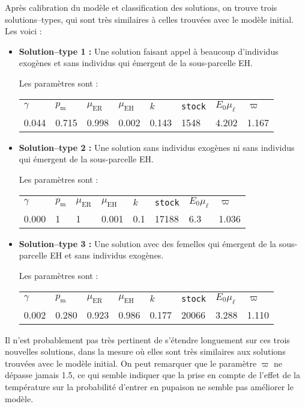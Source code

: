 Après calibration du modèle et classification des solutions, on trouve trois solutions--types, qui sont très similaires à celles trouvées avec le modèle initial.
Les voici :
\begin{itemize}
 \item \textbf{Solution--type 1 :} 
 Une solution faisant appel à beaucoup d'individus exogènes et sans individus qui émergent de la sous-parcelle EH.
 
 Les paramètres sont :
 \begin{center}
\begin{tabular}{llllllll}
$\gamma$ & $p_{\text{m}}$ & $\mu_{\text{ER}}$ & $\mu_{\text{EH}}$ & $k$ & \texttt{stock} & $E_0\mu_{\ell}$ & $\varpi$\\
0.044 & 0.715 & 0.998 & 0.002 & 0.143 & 1548 & 4.202 & 1.167
 \end{tabular}
 \end{center}

\item \textbf{Solution--type 2 :} 
Une solution sans individus exogènes ni sans individus qui émergent de la sous-parcelle EH.

Les paramètres sont :
 \begin{center}
\begin{tabular}{llllllll}
$\gamma$ & $p_{\text{m}}$ & $\mu_{\text{ER}}$ & $\mu_{\text{EH}}$ & $k$ & \texttt{stock} & $E_0\mu_{\ell}$ & $\varpi$\\
0.000 & 1 & 1 & 0.001 & 0.1 & 17188 & 6.3 & 1.036
 \end{tabular}
 \end{center}
 
\item \textbf{Solution--type 3 :}
Une solution avec des femelles qui émergent de la sous-parcelle EH  et sans individus exogènes.

Les paramètres sont :
 \begin{center}
\begin{tabular}{llllllll}
$\gamma$ & $p_{\text{m}}$ & $\mu_{\text{ER}}$ & $\mu_{\text{EH}}$ & $k$ & \texttt{stock} & $E_0\mu_{\ell}$ & $\varpi$\\
0.002 & 0.280 & 0.923 & 0.986 & 0.177 & 20066 & 3.288 & 1.110
 \end{tabular}
 \end{center}
\end{itemize}

Il n'est probablement pas très pertinent de s'étendre longuement sur ces trois nouvelles solutions, dans la mesure où elles sont très similaires aux solutions trouvées avec le modèle initial.
On peut remarquer que le paramètre $\varpi$ ne dépasse jamais 1.5, ce qui semble indiquer que la prise en compte de l'effet de la température sur la probabilité d'entrer en pupaison ne semble pas améliorer le modèle.


